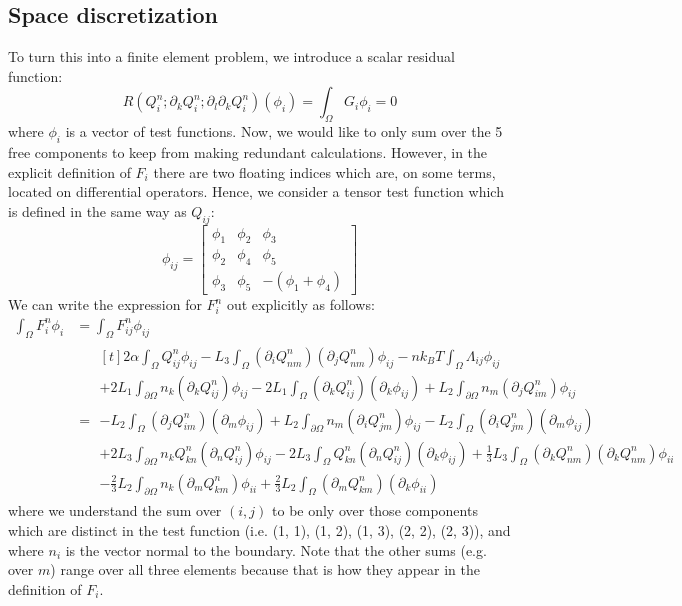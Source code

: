 \documentclass[reqno]{article}
\begin{document}
	\subsection{Space discretization}
	To turn this into a finite element problem, we introduce a scalar residual function:
	\begin{equation}
		R \left(Q^n_i ; \partial_k Q^n_i ; \partial_l \partial_k Q^n_i\right) (\phi_i)
		= \int_\Omega G_i \phi_i
		= 0
	\end{equation}
	where $\phi_i$ is a vector of test functions.
	Now, we would like to only sum over the 5 free components to keep from making redundant calculations.
	However, in the explicit definition of $F_i$ there are two floating indices which are, on some terms, located on differential operators.
	Hence, we consider a tensor test function which is defined in the same way as $Q_{ij}$:
	\begin{equation}
		\phi_{ij}
		= \begin{bmatrix}
		\phi_1 & \phi_2 & \phi_3 \\
		\phi_2 & \phi_4 & \phi_5 \\
		\phi_3 & \phi_5 & -(\phi_1 + \phi_4)
		\end{bmatrix}
	\end{equation}
	We can write the expression for $F^n_i$ out explicitly as follows:
	\begin{equation}
	\begin{split}
		\int_\Omega F^n_i \phi_i
		&=
		\int_\Omega F^n_{ij} \phi_{ij} \\
		&= 
		\begin{multlined}[t]
			2 \alpha \int_\Omega Q^n_{ij} \phi_{ij}
			- L_3 \int_\Omega (\partial_i Q^n_{nm})(\partial_j Q^n_{nm}) \phi_{ij}
			- n k_B T \int_\Omega \Lambda_{ij} \phi_{ij} \\
			+ 2 L_1 \int_{\partial \Omega} n_k (\partial_k Q^n_{ij}) \phi_{ij}
			- 2 L_1 \int_{\Omega} (\partial_k Q^n_{ij})(\partial_k \phi_{ij}) 
			+ L_2 \int_{\partial \Omega} n_m (\partial_j Q^n_{im}) \phi_{ij} \\
			- L_2 \int_\Omega (\partial_j Q^n_{im}) (\partial_m \phi_{ij}) 
			+ L_2 \int_{\partial \Omega} n_m (\partial_i Q^n_{jm}) \phi_{ij}
			- L_2 \int_\Omega (\partial_i Q^n_{jm}) (\partial_m \phi_{ij}) \\
			+ 2 L_3 \int_{\partial \Omega} n_k Q^n_{kn} (\partial_n Q^n_{ij}) \phi_{ij} 
			- 2 L_3 \int_\Omega Q^n_{kn} (\partial_n Q^n_{ij}) (\partial_k \phi_{ij})
			+ \tfrac13 L_3 \int_\Omega (\partial_k Q^n_{nm}) (\partial_k Q^n_{nm}) \phi_{ii} \\
			- \tfrac23 L_2 \int_{\partial \Omega} n_k (\partial_m Q^n_{km}) \phi_{ii}
			+ \tfrac23 L_2 \int_\Omega (\partial_m Q^n_{km}) (\partial_k \phi_{ii})
		\end{multlined}
	\end{split}
	\end{equation}
	where we understand the sum over $(i, j)$ to be only over those components which are distinct in the test function (i.e. (1, 1), (1, 2), (1, 3), (2, 2), (2, 3)), and where $n_i$ is the vector normal to the boundary.
	Note that the other sums (e.g. over $m$) range over all three elements because that is how they appear in the definition of $F_i$.
	
\end{document}
